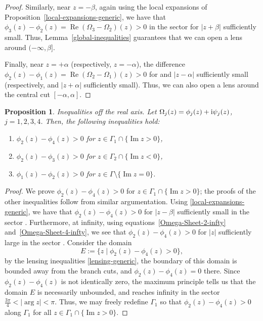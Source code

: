 \documentclass[pdftex]{sigma}
\numberwithin{equation}{section}
\newtheorem{Proposition}[Theorem]{Proposition}
 { \theoremstyle{definition}
\newtheorem{Definition}[Theorem]{Definition}
\newtheorem{Note}[Theorem]{Note}
\newtheorem{Example}[Theorem]{Example}
\newtheorem{Remark}[Theorem]{Remark} }
\begin{document}
\begin{proof}
 Similarly, near $z = -\beta$, again using the local expansions of Proposition~\ref{local-expansions-generic}, we have that $\phi_3(z) - \phi_2(z) = \operatorname{Re}(\Omega_3 - \Omega_2)(z) >0$ in the sector  for $|z+\beta|$ sufficiently small. Thus, Lemma~\ref{global-inequalities} guarantees that we can open a lens around $(-\infty,\beta]$.

 Finally, near $z = +\alpha$ (respectively, $z=-\alpha$), the difference $\phi_2(z) - \phi_1(z) = \operatorname{Re}(\Omega_2 - \Omega_1)(z) >0$ for 
 and $|z-\alpha|$ sufficiently small (respectively,  and $|z+\alpha|$ sufficiently small). Thus, we can also open a lens around the central cut $[-\alpha,\alpha]$.
 \end{proof}

\begin{Proposition}
 \textit{Inequalities off the real axis.}
 Let $\Omega_j(z) = \phi_j(z) + {\rm i}\psi_j(z)$, $j = 1,2,3,4$. Then, the following inequalities hold:
 \begin{enumerate}\itemsep=0pt
 \item[$(1)$] $\phi_2(z) - \phi_4(z) > 0$ for $z \in \Gamma_1 \cap \{\operatorname{Im} z > 0\}$,
 \item[$(2)$] $\phi_2(z) - \phi_3(z) > 0$ for $z \in \Gamma_2 \cap \{\operatorname{Im} z < 0\}$,
 \item[$(3)$] $\phi_1(z) - \phi_2(z) > 0$ for $z \in \Gamma \setminus \{\operatorname{Im} z = 0\}$.
 \end{enumerate}
\end{Proposition}
 \begin{proof}
 We prove $\phi_2(z) - \phi_4(z) > 0$ for $z \in \Gamma_1 \cap \{\operatorname{Im} z > 0\}$; the proofs of the other inequalities follow from similar
 argumentation. Using \eqref{local-expansions-generic}, we have that $\phi_2(z) - \phi_4(z) > 0$ for $|z-\beta|$ sufficiently small in the sector . Furthermore, at infinity, using equations~\eqref{Omega-Sheet-2-infty} and~\eqref{Omega-Sheet-4-infty}, we see that $\phi_2(z) - \phi_4(z) > 0$ for
 $|z|$ sufficiently large in the sector . Consider the domain
 \begin{equation*}
 E := \{z \mid \phi_2(z) - \phi_4(z) > 0 \},
 \end{equation*}
 by the lensing inequalities \eqref{lensing-generic}, the boundary of this domain is bounded away from the branch cuts,
 and $\phi_2(z) - \phi_4(z) = 0$ there. Since $\phi_2(z) - \phi_4(z)$ is not identically zero, the maximum principle tells us that the domain
 $E$ is necessarily unbounded, and reaches infinity in the sector $\frac{3\pi}{4} < |{\arg z}| < \pi$. Thus, we may freely redefine $\Gamma_1$ so that
 $\phi_2(z) - \phi_4(z) > 0$ along $\Gamma_1$ for all $z \in \Gamma_1 \cap \{\operatorname{Im} z > 0\}$.
 \end{proof}
\end{document}
